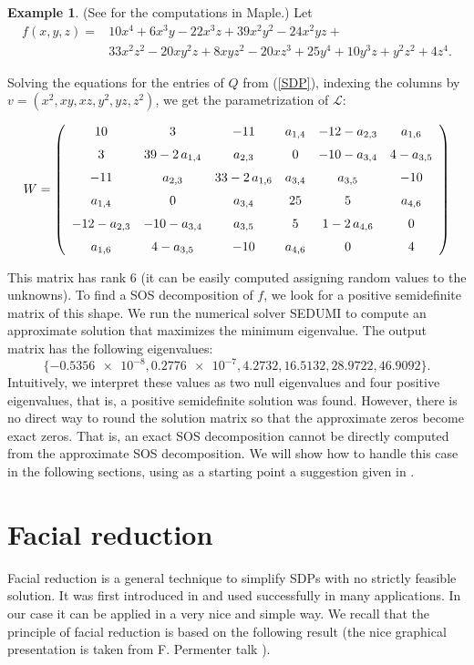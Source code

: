 \documentclass{amsart}
\theoremstyle{definition}
\newtheorem{example}[theorem]{Example}
\theoremstyle{remark}
\numberwithin{equation}{section}
\newcommand{\eLL}{{\mathcal L}}
\begin{document}
\begin{example}
\label{exampleXYZ}
(See \cite[Worksheet A]{rationalSOS} for the computations in Maple.)
Let
\[
\begin{aligned}
f(x,y,z) = {} & 10x^4+6x^3y-22x^3z+39x^2y^2-24x^2yz + {}\\
& 33x^2z^2-20xy^2z+8xyz^2-20xz^3+25y^4+10y^3z+y^2z^2+4z^4.
\end{aligned}
\]

Solving the equations for the entries of $Q$ from (\ref{SDP}), indexing the columns by $v = (x^2, xy, xz, y^2, yz, z^2)$, we get the parametrization of $\eLL$:

\begin{equation}
\label{exampleXYZ-parametrization}
W=\left( \begin {array}{cccccc} 10&3&-11&a_{{1,4}}&-12-a_{{2,3}}&a_{{1,6}}\\ \noalign{\medskip}3&39-2\,a_{{1,4}}&a_{{2,3}}&0&-10-a_{{3,4}}&4-a_{{3,5}}\\ \noalign{\medskip}-11&a_{{2,3}}&33-2\,a_{{1,6}}&a_{{3,4}}&a_{{3,5}}&-10\\ \noalign{\medskip}a_{{1,4}}&0&a_{{3,4}}&25&5&a_{{4,6}}\\ \noalign{\medskip}-12-a_{{2,3}}&-10-a_{{3,4}}&a_{{3,5}}&5&1-2\,a_{{4,6}}&0\\ \noalign{\medskip}a_{{1,6}}&4-a_{{3,5}}&-10&a_{{4,6}}&0&4\end {array} \right)
\end{equation}

This matrix has rank 6 (it can be easily computed assigning random values to the unknowns).
To find a SOS decomposition of $f$, we look for a positive semidefinite matrix of this shape. We run the numerical solver SEDUMI to compute an approximate solution that maximizes the minimum eigenvalue. The output matrix has the following eigenvalues:
\[
\{\num{-0.5356e-8}, \num{0.2776e-7}, 4.2732, 16.5132, 28.9722, 46.9092\}.
\]
Intuitively, we interpret these values as two null eigenvalues and four positive eigenvalues, that is, a positive semidefinite solution was found. However, there is no direct way to round the solution matrix so that the approximate zeros become exact zeros. That is, an exact SOS decomposition cannot be directly computed from the approximate SOS decomposition. We will show how to handle this case in the following sections, using as a starting point a suggestion given in \cite{parrilo}.
\end{example}


\section{Facial reduction}
\label{section:facialreduction}
Facial reduction is a general technique to simplify SDPs with no strictly feasible solution. It was first introduced in \cite{wolkowicz} and used successfully in many applications. In our case it can be applied in a very nice and simple way. We recall that the principle of facial reduction is based on the following result (the nice graphical presentation is taken from F. Permenter talk \cite{permenter}).
\end{document}
